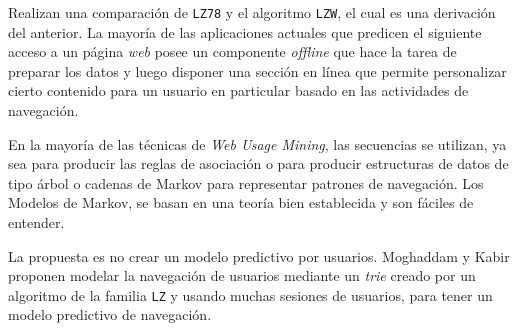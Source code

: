     Realizan una comparación de \texttt{LZ78}  y el algoritmo \texttt{LZW}, el cual es una derivación del anterior. La mayoría de las aplicaciones actuales que predicen el siguiente acceso a un página \emph{web} posee un  componente \emph{offline} que hace la tarea de preparar los datos y luego disponer una sección en línea que permite personalizar cierto contenido para un usuario en particular basado en las actividades de navegación.
	
	En la mayoría de las técnicas de \emph{Web Usage Mining}, las secuencias se utilizan, ya sea para producir las reglas de asociación o para producir estructuras de datos de tipo árbol o cadenas de Markov para representar patrones de navegación. Los  Modelos de Markov, se basan en una teoría bien establecida y son fáciles de entender.  
	

	La propuesta es no crear un modelo predictivo por usuarios.
	Moghaddam y Kabir proponen modelar la navegación de usuarios mediante un \emph{trie} creado por un algoritmo de la familia \texttt{LZ} y usando muchas sesiones de usuarios, para tener un modelo predictivo de navegación.